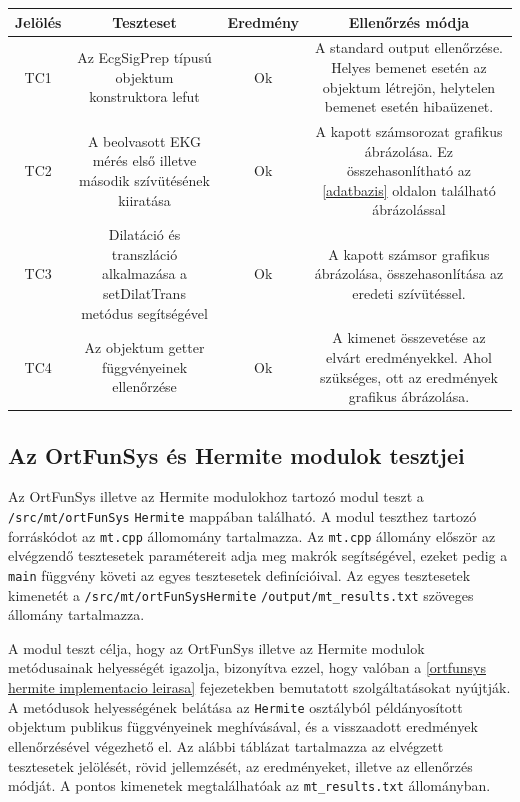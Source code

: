 \documentclass[oneside,titlepage,12pt,a4paper]{report}
\begin{document}
\begin{center}
\begin{adjustbox}{width=1\textwidth}
 \begin{tabular}{||c c c c||} 
 \hline
 Jelölés & Teszteset & Eredmény &  Ellenőrzés módja \\ [0.5ex] 
 \hline\hline
 TC1 & Az EcgSigPrep típusú objektum konstruktora lefut &  Ok & A standard output ellenőrzése. Helyes bemenet esetén az objektum létrejön, helytelen bemenet esetén hibaüzenet. \\ 
 \hline
 TC2 & A beolvasott EKG mérés első illetve második szívütésének kiiratása &  Ok & A kapott számsorozat grafikus ábrázolása. Ez összehasonlítható az \ref{adatbazis} oldalon található ábrázolással \\
 \hline
 TC3 & Dilatáció és transzláció alkalmazása a setDilatTrans metódus segítségével & Ok & A kapott számsor grafikus ábrázolása, összehasonlítása az eredeti szívütéssel. \\
 \hline
 TC4 & Az objektum getter függvényeinek ellenőrzése & Ok & A kimenet összevetése az elvárt eredményekkel. Ahol szükséges, ott az eredmények grafikus ábrázolása. \\
 \hline
\end{tabular}
\end{adjustbox}
\end{center}

\subsection{Az OrtFunSys és Hermite modulok tesztjei}

Az OrtFunSys illetve az Hermite modulokhoz tartozó modul teszt a \texttt{/src/mt/ortFunSys} \linebreak \texttt{Hermite} mappában található. A modul teszthez tartozó forráskódot az \texttt{mt.cpp} állomomány tartalmazza. Az \texttt{mt.cpp} állomány először az elvégzendő tesztesetek paramétereit adja meg makrók segítségével, ezeket pedig a \texttt{main} függvény követi az egyes \linebreak  tesztesetek definícióival. Az egyes tesztesetek kimenetét a \texttt{/src/mt/ortFunSysHermite} \linebreak  \texttt{/output/mt\_results.txt} szöveges állomány tartalmazza. 
\par A modul teszt célja, hogy az OrtFunSys illetve az Hermite modulok metódusainak helyességét igazolja, bizonyítva ezzel, hogy valóban a \ref{ortfunsys hermite implementacio leirasa} fejezetekben bemutatott szolgáltatásokat nyújtják. A metódusok helyességének belátása az \texttt{Hermite} osztályból példányosított objektum publikus függvényeinek meghívásával, és a visszaadott eredmények ellenőrzésével végezhető el. Az alábbi táblázat tartalmazza az elvégzett tesztesetek jelölését, rövid jellemzését, az eredményeket, illetve az ellenőrzés módját. A pontos kimenetek megtalálhatóak az \texttt{mt\_results.txt} állományban. 
\end{document}
